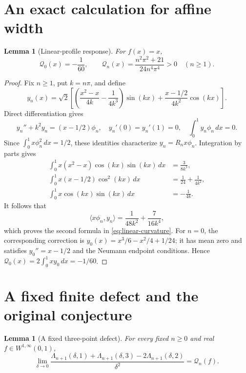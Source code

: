 \documentclass[11pt,a4paper]{article}
\newtheorem{lemma}[theorem]{Lemma}
\theoremstyle{definition}\newtheorem{definition}[theorem]{Definition}
\theoremstyle{remark}\newtheorem{remark}[theorem]{Remark}
\begin{document}
\section{An exact calculation for affine width}

\begin{lemma}[Linear-profile response]\label{lem:linear-response}
For $f(x)=x$,
\begin{equation}\label{eq:linear-curvature}
 \mathcal Q_0(x)=-\frac1{60},\qquad
 \mathcal Q_n(x)=\frac{n^2\pi^2+21}{24n^4\pi^4}>0
       \quad(n\geq1).
\end{equation}
\end{lemma}

\begin{proof}
Fix $n\geq1$, put $k=n\pi$, and define
\[
 y_n(x)=\sqrt2\left[
 \left(\frac{x^2-x}{4k}-\frac1{4k^3}\right)\sin(kx)
       +\frac{x-1/2}{4k^2}\cos(kx)\right].
\]
Direct differentiation gives
\[
 y_n''+k^2y_n=(x-1/2)\phi_n,\quad
 y_n'(0)=y_n'(1)=0,\quad
 \int_0^1y_n\phi_n\,dx=0.
\]
Since $\int_0^1x\phi_n^2\,dx=1/2$, these identities characterize
$y_n=R_nx\phi_n$. Integration by parts gives
\begin{align*}
 \int_0^1x(x^2-x)\cos(kx)\sin(kx)\,dx&=\frac3{8k^3},\\
 \int_0^1x(x-1/2)\cos^2(kx)\,dx&=\frac1{24}+\frac1{4k^2},\\
 \int_0^1x\cos(kx)\sin(kx)\,dx&=-\frac1{4k}.
\end{align*}
It follows that
\[
 \langle x\phi_n,y_n\rangle
 =\frac1{48k^2}+\frac7{16k^4},
\]
which proves the second formula in \eqref{eq:linear-curvature}.
For $n=0$, the corresponding correction is
$y_0(x)=x^3/6-x^2/4+1/24$; it has mean zero and satisfies
$y_0''=x-1/2$ and the Neumann endpoint conditions. Hence
$\mathcal Q_0(x)=2\int_0^1xy_0\,dx=-1/60$.
\end{proof}


\section{A fixed finite defect and the original conjecture}
\begin{lemma}[A fixed three-point defect]\label{lem:fixed-defect}
For every fixed $n\geq0$ and real $f\in W^{1,\infty}(0,1)$,
\begin{equation}\label{eq:fixed-defect-limit}
 \lim_{\delta\to0}\frac{
 \Lambda_{n+1}(\delta,1)+\Lambda_{n+1}(\delta,3)
                      -2\Lambda_{n+1}(\delta,2)}{\delta^2}
 =\mathcal Q_n(f).
\end{equation}
\end{lemma}
\end{document}
